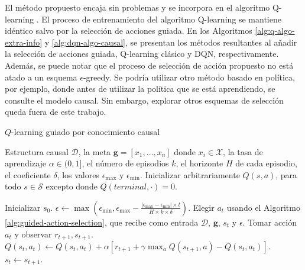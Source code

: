 

El método propuesto encaja sin problemas y se incorpora en el algoritmo Q-learning \cite{watkins1992q}. El proceso de entrenamiento 
 del algoritmo Q-learning se mantiene idéntico salvo por  la selección de acciones guiada.
En los Algoritmos
\ref{alg:q-algo-extra-info} y \ref{alg:dqn-algo-causal}, se presentan los métodos resultantes al añadir la selección de acciones guiada, Q-learning clásico y DQN, respectivamente. Además, se puede notar que el proceso de selección de acción propuesto no está atado a un esquema $\epsilon$-greedy. Se podría utilizar otro método basado en política, por ejemplo, donde antes de utilizar la política que se está aprendiendo, se consulte el modelo causal. Sin embargo, explorar otros esquemas de selección queda fuera de este trabajo.

\begin{mialgoritmo}[H]
  	\caption{$Q$-learning guiado por conocimiento causal}
	\label{alg:q-algo-extra-info}
  \begin{algorithmic}[1]
  \REQUIRE Estructura causal $\mathcal{D}$, la meta $\mathbf{g} = [x_1, \dots, x_n]$ donde $x_i \in \mathcal{X}$, la tasa de aprendizaje $\alpha \in (0,1]$, el número de episodios $k$, el horizonte $H$ de cada episodio, el coeficiente $\delta$, los valores $\epsilon_{\max}$ y $\epsilon_{\min}$.
  \STATE Inicializar arbitrariamente $Q(s,a)$, para todo $s\in \mathcal{S}$ excepto donde $Q(terminal, \cdot) = 0$.
  
    \STATE Inicializar $s_0$.
    \STATE $\epsilon \leftarrow \max(\epsilon_{\min}, \epsilon_{\max} - \frac{|\epsilon_{\max} - \epsilon_{\min}| \times t}{H \times k \times \delta})$.
    \STATE Elegir $a_t$ usando el Algoritmo \ref{alg:guided-action-selection}, que recibe como entrada $\mathcal{D}$, $\mathbf{g}$, $s_t$ y $\epsilon$.
    \STATE Tomar acción $a_t$ y observar $r_{t+1}, s_{t+1}$.
    \STATE $Q(s_t, a_t) \leftarrow Q(s_t, a_t) + \alpha [r_{t+1} + \gamma \max_a Q(s_{t+1}, a) - Q(s_t, a_t)]$.
    \STATE $s_t \leftarrow s_{t+1}$.
    \ENDFOR
  \ENDFOR
  \end{algorithmic}
\end{mialgoritmo}


